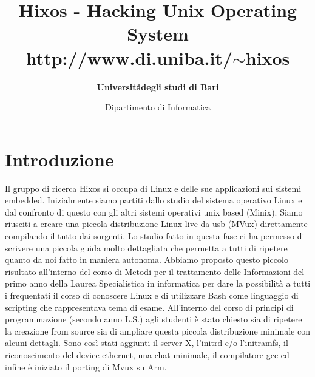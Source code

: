 \documentclass[a4paper,12pt]{article}
\title{\textbf{Hixos} - Hacking Unix Operating System\\http://www.di.uniba.it/$\sim$hixos}
\author{\textbf{Universit\aa degli studi di Bari}}
\date{Dipartimento di Informatica}
\renewcommand{\aa }{\`{a} }
\newcommand{\ea }{\`{e} }
\newcommand{\ia }{\`{i} }
\begin{document}
\maketitle

\section*{Introduzione}
Il gruppo di ricerca Hixos si occupa di Linux e delle sue applicazioni sui sistemi embedded.
Inizialmente siamo partiti dallo studio del sistema operativo Linux e dal confronto di questo con gli altri sistemi operativi unix based (Minix).
Siamo riusciti a creare una piccola distribuzione Linux live da usb (MVux) direttamente compilando il tutto dai sorgenti.
Lo studio fatto in questa fase ci ha permesso di scrivere una piccola guida molto dettagliata che permetta a tutti di ripetere quanto da noi fatto in maniera autonoma.
Abbiamo proposto questo piccolo risultato all'interno del corso di Metodi per il trattamento delle Informazioni del primo anno della Laurea Specialistica in informatica per dare la possibilit\aa a tutti i frequentati il corso di conoscere Linux e di utilizzare Bash come linguaggio di scripting che rappresentava tema di esame.
All'interno del corso di principi di programmazione (secondo anno L.S.) agli studenti \ea stato chiesto sia di ripetere la creazione from source sia di ampliare questa piccola distribuzione minimale con alcuni dettagli. Sono cos\ia stati aggiunti il server X, l'initrd e\slash o l'initramfs, il riconoscimento del device ethernet, una chat minimale, il compilatore gcc ed infine \ea iniziato il porting di Mvux su Arm.
\end{document}
